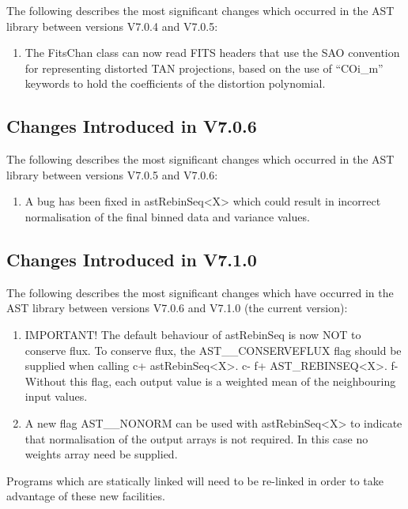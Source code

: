 \documentclass[twoside,11pt]{article}
\newcommand{\xlabel}[1]{}
\begin{document}
The following describes the most significant changes which
occurred in the AST library between versions V7.0.4 and V7.0.5:

\begin{enumerate}

\item The FitsChan class can now read FITS headers that use the SAO
convention for representing distorted TAN projections, based on the use
of ``COi\_m'' keywords to hold the coefficients of the distortion polynomial.

\end{enumerate}


\subsection{Changes Introduced in V7.0.6}

The following describes the most significant changes which
occurred in the AST library between versions V7.0.5 and V7.0.6:

\begin{enumerate}

\item A bug has been fixed in astRebinSeq<X> which could result in
incorrect normalisation of the final binned data and variance values.

\end{enumerate}


\subsection{\xlabel{changes}\xlabel{list_of_most_recent_changes}Changes
Introduced in V7.1.0}

The following describes the most significant changes which have
occurred in the AST library between versions V7.0.6 and V7.1.0 (the
current version):

\begin{enumerate}

\item IMPORTANT! The default behaviour of astRebinSeq is now NOT to conserve
flux. To conserve flux, the AST\_\_CONSERVEFLUX flag should be supplied
when calling
c+
astRebinSeq<X>.
c-
f+
AST\_REBINSEQ<X>.
f-
Without this flag, each output value is a weighted mean of the neighbouring
input values.

\item A new flag AST\_\_NONORM can be used with astRebinSeq<X> to indicate that
normalisation of the output arrays is not required. In this case no
weights array need be supplied.

\end{enumerate}

Programs which are statically linked will need to be re-linked in
order to take advantage of these new facilities.
\end{document}
